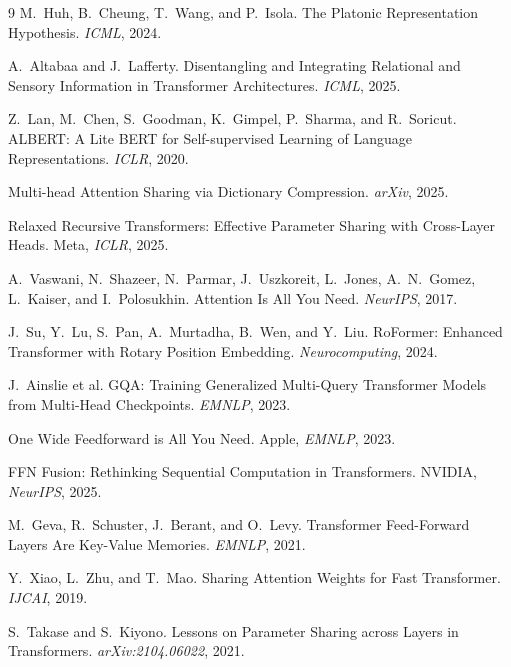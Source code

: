 \documentclass[11pt, a4paper]{article}
\theoremstyle{remark}
\begin{document}
\begin{thebibliography}{9}
M.~Huh, B.~Cheung, T.~Wang, and P.~Isola.
\newblock The Platonic Representation Hypothesis.
\newblock \emph{ICML}, 2024.

A.~Altabaa and J.~Lafferty.
\newblock Disentangling and Integrating Relational and Sensory Information in Transformer Architectures.
\newblock \emph{ICML}, 2025.

Z.~Lan, M.~Chen, S.~Goodman, K.~Gimpel, P.~Sharma, and R.~Soricut.
\newblock ALBERT: A Lite BERT for Self-supervised Learning of Language Representations.
\newblock \emph{ICLR}, 2020.

Multi-head Attention Sharing via Dictionary Compression.
\newblock \emph{arXiv}, 2025.

Relaxed Recursive Transformers: Effective Parameter Sharing with Cross-Layer Heads.
\newblock Meta, \emph{ICLR}, 2025.

A.~Vaswani, N.~Shazeer, N.~Parmar, J.~Uszkoreit, L.~Jones, A.~N.~Gomez, L.~Kaiser, and I.~Polosukhin.
\newblock Attention Is All You Need.
\newblock \emph{NeurIPS}, 2017.

J.~Su, Y.~Lu, S.~Pan, A.~Murtadha, B.~Wen, and Y.~Liu.
\newblock RoFormer: Enhanced Transformer with Rotary Position Embedding.
\newblock \emph{Neurocomputing}, 2024.

J.~Ainslie et al.
\newblock GQA: Training Generalized Multi-Query Transformer Models from Multi-Head Checkpoints.
\newblock \emph{EMNLP}, 2023.

One Wide Feedforward is All You Need.
\newblock Apple, \emph{EMNLP}, 2023.

FFN Fusion: Rethinking Sequential Computation in Transformers.
\newblock NVIDIA, \emph{NeurIPS}, 2025.

M.~Geva, R.~Schuster, J.~Berant, and O.~Levy.
\newblock Transformer Feed-Forward Layers Are Key-Value Memories.
\newblock \emph{EMNLP}, 2021.


Y.~Xiao, L.~Zhu, and T.~Mao.
\newblock Sharing Attention Weights for Fast Transformer.
\newblock \emph{IJCAI}, 2019.

S.~Takase and S.~Kiyono.
\newblock Lessons on Parameter Sharing across Layers in Transformers.
\newblock \emph{arXiv:2104.06022}, 2021.


\end{thebibliography}
\end{document}
